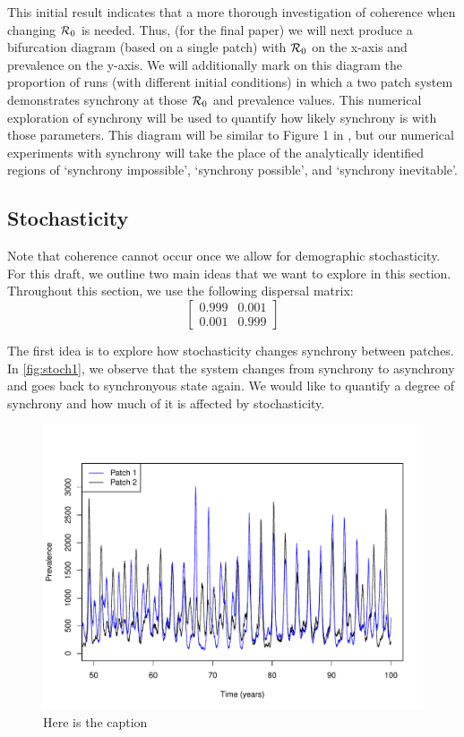 \documentclass[12pt]{article}
\newcommand{\R}{{\cal R}}
\begin{document}
This initial result indicates that a more thorough investigation of coherence when changing $\R_0$ is needed. Thus, (for the final paper) we will next produce a bifurcation diagram (based on a single patch) with $\R_0$ on the x-axis and prevalence on the y-axis. We will additionally mark on this diagram the proportion of runs (with different initial conditions) in which a two patch system demonstrates synchrony at those $\R_0$ and prevalence values. This numerical exploration of synchrony will be used to quantify how likely synchrony is with those parameters. This diagram will be similar to Figure 1 in \cite{Earn2000conservation}, but our numerical experiments with synchrony will take the place of the analytically identified regions of `synchrony impossible', `synchrony possible', and `synchrony inevitable'. 

\subsection{Stochasticity}
\label{ss:stochasticity}

Note that coherence cannot occur once we allow for demographic stochasticity. For this draft, we outline two main ideas that we want to explore in this section.
Throughout this section, we use the following dispersal matrix:
$$
\begin{bmatrix}
0.999 & 0.001\\
0.001 & 0.999
\end{bmatrix}
$$

The first idea is to explore how stochasticity changes synchrony between patches. In \autoref{fig:stoch1}, we observe that the system changes from synchrony to asynchrony and goes back to synchronyous state again. We would like to quantify a degree of synchrony and how much of it is affected by stochasticity.

\begin{figure}
\centering
\includegraphics[width=.65\linewidth]{stochfig/stochastic1.pdf} 
\caption[???]{Here is the caption}\label{fig:stoch1}
\end{figure}
\end{document}
